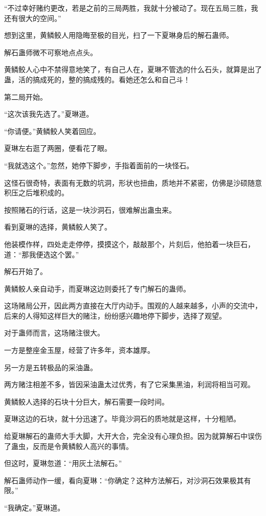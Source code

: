 \begin{this_body}
“不过幸好赌约更改，若是之前的三局两胜，我就十分被动了。现在五局三胜，我还有很大的空间。”

想到这里，黄鳞鲛人用隐晦至极的目光，扫了一下夏琳身后的解石蛊师。

解石蛊师微不可察地点点头。

黄鳞鲛人心中不禁得意地笑了，有自己人在，夏琳不管选的什么石头，就算是出了蛊，活的搞成死的，整的搞成残的。看她还怎么和自己斗！

第二局开始。

“这次该我先选了。”夏琳道。

“你请便。”黄鳞鲛人笑着回应。

夏琳左右逛了两圈，便看花了眼。

“我就选这个。”忽然，她停下脚步，手指着面前的一块怪石。

这怪石很奇特，表面有无数的坑洞，形状也扭曲，质地并不紧密，仿佛是沙硕随意积压之后堆积成的。

按照赌石的行话，这是一块沙洞石，很难解出蛊虫来。

看到夏琳的选择，黄鳞鲛人笑了。

他装模作样，四处走走停停，摸摸这个，敲敲那个，片刻后，他拍着一块巨石，道：“那我便选这个罢。”

解石开始了。

黄鳞鲛人亲自动手，而夏琳这边则委托了专门解石的蛊师。

这场赌局公开，因此两方直接在大厅内动手。围观的人越来越多，小声的交流中，后来的人得知这样巨大的赌注，纷纷感兴趣地停下脚步，选择了观望。

对于蛊师而言，这场赌注很大。

一方是整座金玉屋，经营了许多年，资本雄厚。

另一方是五转极品的采油蛊。

两方赌注相差不多，皆因采油蛊太过优秀，有了它采集黑油，利润将相当可观。

黄鳞鲛人选择的石块十分巨大，解石需要一段时间。

夏琳这边的石块，就十分迅速了。毕竟沙洞石的质地就是这样，十分粗陋。

给夏琳解石的蛊师大手大脚，大开大合，完全没有心理负担。因为就算解石中误伤了蛊虫，反而是令黄鳞鲛人高兴的事情。

但这时，夏琳忽道：“用灰土法解石。”

解石蛊师动作一缓，看向夏琳：“你确定？这种方法解石，对沙洞石效果极其有限。”

“我确定。”夏琳道。


\end{this_body}
